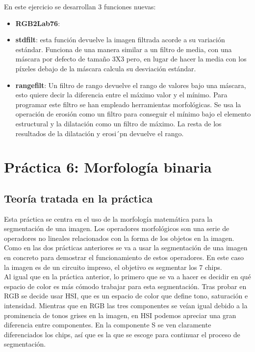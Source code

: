 \documentclass[a4paper,12pt]{report}
\begin{document}
En este ejercicio se desarrollan 3 funciones nuevas:
\begin{itemize}

	\item \textbf{ RGB2Lab76}:
	\item \textbf{ stdfilt}: esta función devuelve la imagen filtrada acorde a su variación estándar. Funciona de una manera similar a un filtro de media, con una máscara por defecto de tamaño 3X3 pero, en lugar de hacer la media con los píxeles debajo de la máscara calcula su desviación estándar.

	\item \textbf{rangefilt}: Un filtro de rango devuelve el rango de valores bajo una máscara, esto quiere decir la diferencia entre el máximo valor y el mínimo. Para programar este filtro se han empleado herramientas morfológicas. Se usa la operación de erosión como un filtro para conseguir el mínimo bajo el elemento estructural y la dilatación como un filtro de máximo. La resta de los resultados de la dilatación y erosi´pn devuelve el rango.\\
\end{itemize}


\section{ Práctica 6: Morfología binaria}
\subsection{Teoría tratada en la práctica}

Esta práctica se centra en el uso de la morfología matemática para la segmentación de una imagen. Los operadores morfológicos son una serie de operadores no lineales relacionados con la forma de los objetos en la imagen. Como en las dos prácticas anteriores se va a usar la segmentación de una imagen en concreto para demostrar el funcionamiento de estos operadores. En este caso la imagen es de un circuito impreso, el objetivo es segmentar los 7 chips.\\

Al igual que en la práctica anterior, lo primero que se va a hacer es decidir en qué espacio de color es más cómodo trabajar para esta segmentación. Tras probar en RGB se decide usar HSI, que es un espacio de color que define tono, saturación e intensidad. Mientras que en RGB las tres componentes se veían igual debido a la prominencia de tonos grises en la imagen, en HSI podemos apreciar una gran diferencia entre componentes. En la componente S se ven claramente diferenciados los chips, así que es la que se escoge para continuar el proceso de segmentación.\\
\end{document}
